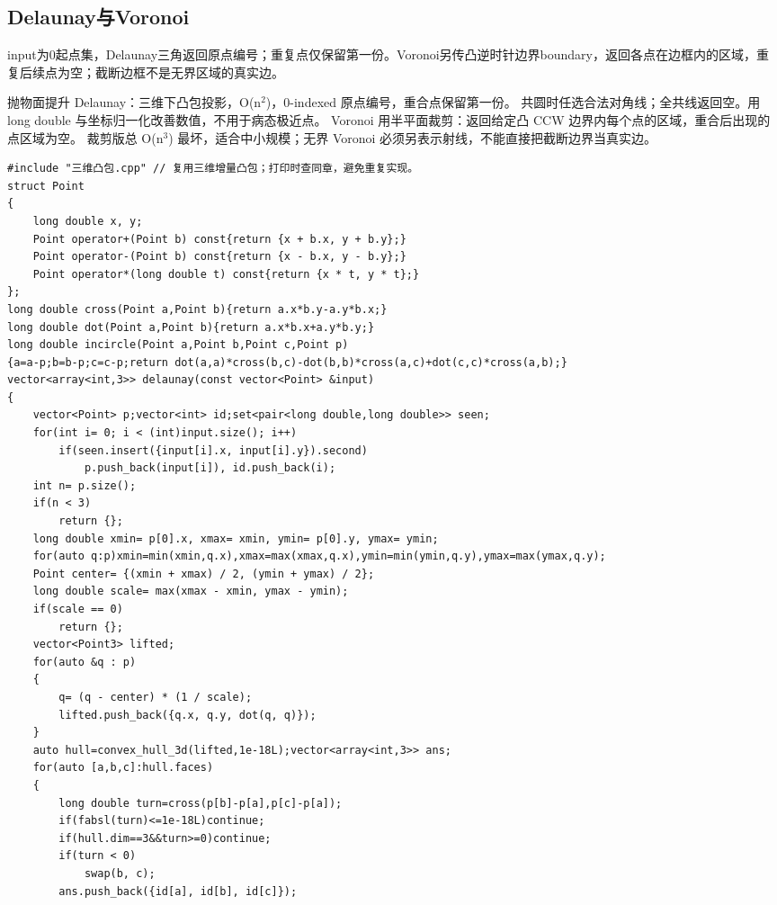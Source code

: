 \documentclass[UTF8,fontset=fandol,a4paper,twoside]{ctexart}
\newcommand{\note}[1]{{\fontsize{10}{12}\selectfont #1\par}}
\begin{document}
\begin{multicols}{2}
\subsection{Delaunay与Voronoi}

\note{input为0起点集，Delaunay三角返回原点编号；重复点仅保留第一份。Voronoi另传凸逆时针边界boundary，返回各点在边框内的区域，重复后续点为空；截断边框不是无界区域的真实边。}
\note{抛物面提升 Delaunay：三维下凸包投影，O(\allowbreak{}n\ensuremath{^2})\allowbreak{}，0-\allowbreak{}indexed 原点编号，重合点保留第一份。 共圆时任选合法对角线；全共线返回空。用 long double 与坐标归一化改善数值，不用于病态极近点。 Voronoi 用半平面裁剪：返回给定凸 CCW 边界内每个点的区域，重合后出现的点区域为空。 裁剪版总 O(\allowbreak{}n\ensuremath{^3})\allowbreak{} 最坏，适合中小规模；无界 Voronoi 必须另表示射线，不能直接把截断边界当真实边。}
\begin{lstlisting}
#include "三维凸包.cpp" // 复用三维增量凸包；打印时查同章，避免重复实现。
struct Point
{
    long double x, y;
    Point operator+(Point b) const{return {x + b.x, y + b.y};}
    Point operator-(Point b) const{return {x - b.x, y - b.y};}
    Point operator*(long double t) const{return {x * t, y * t};}
};
long double cross(Point a,Point b){return a.x*b.y-a.y*b.x;}
long double dot(Point a,Point b){return a.x*b.x+a.y*b.y;}
long double incircle(Point a,Point b,Point c,Point p)
{a=a-p;b=b-p;c=c-p;return dot(a,a)*cross(b,c)-dot(b,b)*cross(a,c)+dot(c,c)*cross(a,b);}
vector<array<int,3>> delaunay(const vector<Point> &input)
{
    vector<Point> p;vector<int> id;set<pair<long double,long double>> seen;
    for(int i= 0; i < (int)input.size(); i++)
        if(seen.insert({input[i].x, input[i].y}).second)
            p.push_back(input[i]), id.push_back(i);
    int n= p.size();
    if(n < 3)
        return {};
    long double xmin= p[0].x, xmax= xmin, ymin= p[0].y, ymax= ymin;
    for(auto q:p)xmin=min(xmin,q.x),xmax=max(xmax,q.x),ymin=min(ymin,q.y),ymax=max(ymax,q.y);
    Point center= {(xmin + xmax) / 2, (ymin + ymax) / 2};
    long double scale= max(xmax - xmin, ymax - ymin);
    if(scale == 0)
        return {};
    vector<Point3> lifted;
    for(auto &q : p)
    {
        q= (q - center) * (1 / scale);
        lifted.push_back({q.x, q.y, dot(q, q)});
    }
    auto hull=convex_hull_3d(lifted,1e-18L);vector<array<int,3>> ans;
    for(auto [a,b,c]:hull.faces)
    {
        long double turn=cross(p[b]-p[a],p[c]-p[a]);
        if(fabsl(turn)<=1e-18L)continue;
        if(hull.dim==3&&turn>=0)continue;
        if(turn < 0)
            swap(b, c);
        ans.push_back({id[a], id[b], id[c]});

\end{lstlisting}
\end{multicols}
\end{document}
